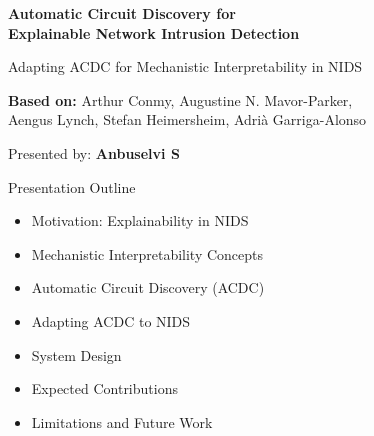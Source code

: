 \documentclass{beamer}
\begin{document}
	\begin{frame}
		\centering
		
		{\Large\bfseries Automatic Circuit Discovery for\\[4pt]
			Explainable Network Intrusion Detection}
		
		\vspace{14pt}
		
		{\normalsize
			Adapting ACDC for Mechanistic Interpretability in NIDS}
		
		\vspace{22pt}
		
		{\small
			\textbf{Based on:} Arthur Conmy, Augustine N. Mavor-Parker,\\
			Aengus Lynch, Stefan Heimersheim, Adri\`a Garriga-Alonso}
		
		\vfill
		
		{\small
			Presented by: \textbf{Anbuselvi S}}
	\end{frame}

	\begin{frame}{Presentation Outline}
		\begin{itemize}
			\setstretch{1.4}
			\item Motivation: Explainability in NIDS
			\item Mechanistic Interpretability Concepts
			\item Automatic Circuit Discovery (ACDC)
			\item Adapting ACDC to NIDS
			\item System Design
			\item Expected Contributions
			\item Limitations and Future Work
		\end{itemize}
	\end{frame}
	
\end{document}
